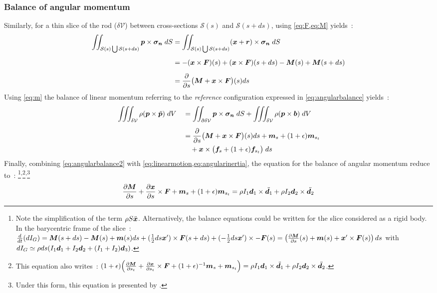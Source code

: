 \subsubsection{Balance of angular momentum}
Similarly, for a thin slice of the rod ($\delta\mathcal{V}$) between cross-sections $\mathcal{S}(s)$ and $\mathcal{S}(s+ds)$, using \cref{eq:F,eq:M} yields~: 
\begin{alignat}{5}
	\iint_{\mathcal{S}(s) \bigcup \mathcal{S}(s+ds)} \boldsymbol{p} \times \boldsymbol{\sigma_n} \;dS
	&= \iint_{\mathcal{S}(s) \bigcup \mathcal{S}(s+ds)} (\boldsymbol{x} + \boldsymbol{r}) \times \boldsymbol{\sigma_n} \;dS 
	\\[0.5em]
	&= -(\boldsymbol{x}\times\boldsymbol{F})(s) + (\boldsymbol{x}\times\boldsymbol{F})(s+ds) - \boldsymbol{M}(s) + \boldsymbol{M}(s+ds) \nonumber
	\\[0.5em]
	&=  \frac{\partial}{\partial s} \big( \boldsymbol{M} + \boldsymbol{x}\times\boldsymbol{F} \big)(s) ds \nonumber
\end{alignat}
Using \cref{eq:m} the balance of linear momentum referring to the \emph{reference} configuration expressed in \cref{eq:angularbalance} yields~: 
\begin{alignat}{5}
	\label{eq:angularbalance2}
	&\iiint_{\delta\mathcal{V}} \rho (\boldsymbol{p} \times \ddot{\boldsymbol{p}}) \;dV  
	&&=  \iint_{\partial\delta\mathcal{V}} \boldsymbol{p} \times \boldsymbol{\sigma_n} \;dS 
	+ \iiint_{\delta\mathcal{V}} \rho (\boldsymbol{p} \times \boldsymbol{b}) \;dV
	\nonumber \\[0.5em]
	& &&= \frac{\partial}{\partial s} \big( \boldsymbol{M} + \boldsymbol{x}\times\boldsymbol{F} \big)(s) ds 
	+ \boldsymbol{m}_{s}  + (1+\epsilon)\boldsymbol{m}_{s_t}  \\
	& &&\quad + \boldsymbol{x} \times \big(\boldsymbol{f}_{s}  + (1+\epsilon)\boldsymbol{f}_{s_t} \big) \;ds \nonumber
\end{alignat}
Finally, combining \cref{eq:angularbalance2} with \cref{eq:linearmotion,eq:angularinertia}, the equation for the balance of angular momentum reduce to~: \footnote{Note the simplification of the term $\rho S \ddot{\boldsymbol{x}}$. Alternatively, the balance equations could be written for the slice considered as a rigid body. In the barycentric frame of the slice~: $\frac{d}{dt}(dI_G) = \boldsymbol{M}(s+ds)-\boldsymbol{M}(s) + \boldsymbol{m}(s)ds + (\tfrac{1}{2}ds\boldsymbol{x}')\times \boldsymbol{F}(s+ds) + (-\tfrac{1}{2}ds\boldsymbol{x}')\times -\boldsymbol{F}(s) = \left(\frac{\partial \boldsymbol{M}}{\partial s}(s)+\boldsymbol{m}(s) + \boldsymbol{x}'\times \boldsymbol{F}(s)\right)ds$ with $dI_G \simeq \rho ds (I_1 \boldsymbol{d}_1 + I_2 \boldsymbol{d}_2 + (I_1+I_2) \boldsymbol{d}_3)$.}\textsuperscript{,}\footnote{This equation also writes~: $(1+\epsilon)\Bigl(\frac{\partial \boldsymbol{M}}{\partial s_t} + \frac{\partial \boldsymbol{x}}{\partial s_t} \times \boldsymbol{F} + (1+\epsilon)^{-1}\boldsymbol{m}_{s}  +  \boldsymbol{m}_{s_t} \Bigr) = \rho I_1 \boldsymbol{d}_1 \times \ddot{\boldsymbol{d}_1} + \rho I_2 \boldsymbol{d}_2 \times \ddot{\boldsymbol{d}_2}$.}\textsuperscript{,}\footnote{Under this form, this equation is presented by .}
\begin{equation}
	\frac{\partial \boldsymbol{M}}{\partial s} 
	+ \frac{\partial \boldsymbol{x}}{\partial s} \times \boldsymbol{F}
	+ \boldsymbol{m}_{s}  + (1+\epsilon)\boldsymbol{m}_{s_t}  
	= \rho I_1 \boldsymbol{d}_1 \times \ddot{\boldsymbol{d}_1} + \rho I_2 \boldsymbol{d}_2 \times \ddot{\boldsymbol{d}_2}
\end{equation}

